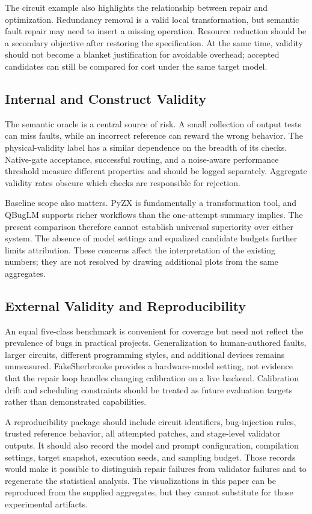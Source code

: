 \documentclass[conference]{IEEEtran}
\begin{document}
The circuit example also highlights the relationship between repair and optimization. Redundancy removal is a valid local transformation, but semantic fault repair may need to insert a missing operation. Resource reduction should be a secondary objective after restoring the specification. At the same time, validity should not become a blanket justification for avoidable overhead; accepted candidates can still be compared for cost under the same target model.

\subsection{Internal and Construct Validity}
The semantic oracle is a central source of risk. A small collection of output tests can miss faults, while an incorrect reference can reward the wrong behavior. The physical-validity label has a similar dependence on the breadth of its checks. Native-gate acceptance, successful routing, and a noise-aware performance threshold measure different properties and should be logged separately. Aggregate validity rates obscure which checks are responsible for rejection.

Baseline scope also matters. PyZX is fundamentally a transformation tool, and QBugLM supports richer workflows than the one-attempt summary implies. The present comparison therefore cannot establish universal superiority over either system. The absence of model settings and equalized candidate budgets further limits attribution. These concerns affect the interpretation of the existing numbers; they are not resolved by drawing additional plots from the same aggregates.

\subsection{External Validity and Reproducibility}
\balance
An equal five-class benchmark is convenient for coverage but need not reflect the prevalence of bugs in practical projects. Generalization to human-authored faults, larger circuits, different programming styles, and additional devices remains unmeasured. FakeSherbrooke provides a hardware-model setting, not evidence that the repair loop handles changing calibration on a live backend. Calibration drift and scheduling constraints should be treated as future evaluation targets rather than demonstrated capabilities.

A reproducibility package should include circuit identifiers, bug-injection rules, trusted reference behavior, all attempted patches, and stage-level validator outputs. It should also record the model and prompt configuration, compilation settings, target snapshot, execution seeds, and sampling budget. Those records would make it possible to distinguish repair failures from validator failures and to regenerate the statistical analysis. The visualizations in this paper can be reproduced from the supplied aggregates, but they cannot substitute for those experimental artifacts.
\end{document}
